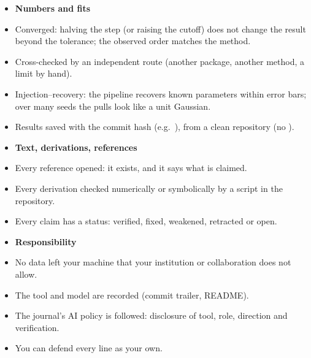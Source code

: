 \begin{itemize}[label={}, leftmargin=0pt, itemsep=0pt, parsep=0pt]
\smallskip
\item \textbf{Numbers and fits}
\item \cb Converged: halving the step (or raising the cutoff) does not change the result
      beyond the tolerance; the observed order matches the method.
\item \cb Cross-checked by an independent route (another package, another method, a
      limit by hand).
\item \cb Injection--recovery: the pipeline recovers known parameters within error bars;
      over many seeds the pulls look like a unit Gaussian.
\item \cb Results saved with the commit hash (e.g.\ ), from a
      clean repository (no ).

\smallskip
\item \textbf{Text, derivations, references}
\item \cb Every reference opened: it exists, and it says what is claimed.
\item \cb Every derivation checked numerically or symbolically by a script in the
      repository.
\item \cb Every claim has a status: verified, fixed, weakened, retracted or open.

\smallskip
\item \textbf{Responsibility}
\item \cb No data left your machine that your institution or collaboration does not allow.
\item \cb The tool and model are recorded (commit trailer, README).
\item \cb The journal's AI policy is followed: disclosure of tool, role, direction and
      verification.
\item \cb You can defend every line as your own.
\end{itemize}

